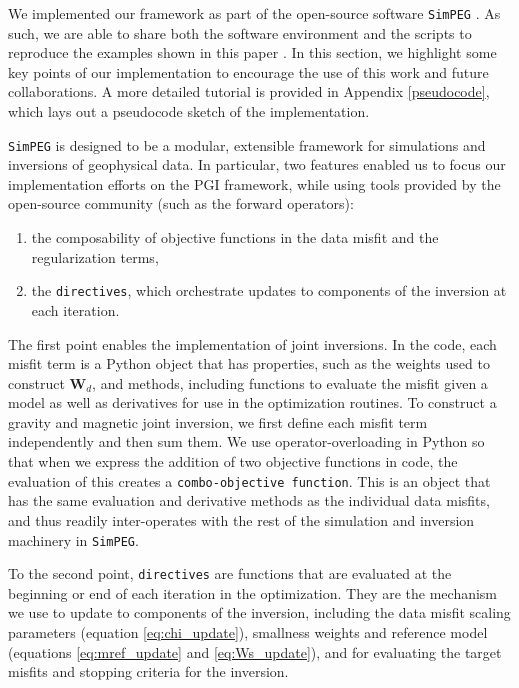 \documentclass[extra, mreferee]{gji_joint} %
\begin{document}
We implemented our framework as part of the open-source software \texttt{SimPEG} \citep{Cockett2015, heagy2017framework}. As such, we are able to share both the software environment and the scripts to reproduce the examples shown in this paper \citep{PGIJointExamples}. In this section, we highlight some key points of our implementation to encourage the use of this work and future collaborations. A more detailed tutorial is provided in Appendix \ref{pseudocode}, which lays out a pseudocode sketch of the implementation.

\texttt{SimPEG} is designed to be a modular, extensible framework for simulations and inversions of geophysical data. In particular, two features enabled us to focus our implementation efforts on the PGI framework, while using tools provided by the open-source community (such as the forward operators):

\begin{enumerate}
\item the composability of objective functions in the data misfit and the regularization terms,
\item the \texttt{directives}, which orchestrate updates to components of the inversion at each iteration.
\end{enumerate}

The first point enables the implementation of joint inversions. In the code, each misfit term is a Python object that has properties, such as the weights used to construct $\mathbf{W}_d$, and methods, including functions to evaluate the misfit given a model as well as derivatives for use in the optimization routines. To construct a gravity and magnetic joint inversion, we first define each misfit term independently and then sum them. We use operator-overloading in Python so that when we express the addition of two objective functions in code, the evaluation of this creates a \texttt{combo-objective function}. This is an object that has the same evaluation and derivative methods as the individual data misfits, and thus readily inter-operates with the rest of the simulation and inversion machinery in \texttt{SimPEG}.

To the second point, \texttt{directives} are functions that are evaluated at the beginning or end of each iteration in the optimization. They are the mechanism we use to update to components of the inversion, including the data misfit scaling parameters (equation \eqref{eq:chi_update}), smallness weights and reference model (equations \eqref{eq:mref_update} and \eqref{eq:Ws_update}), and for evaluating the target misfits and stopping criteria for the inversion.
\end{document}
